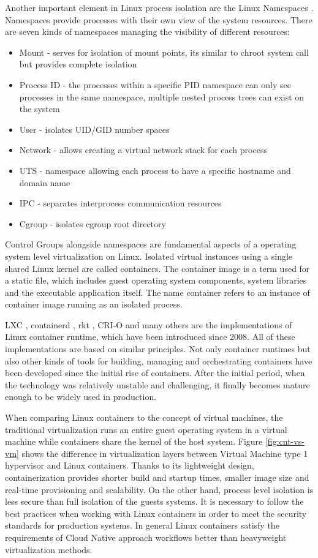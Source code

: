 \documentclass[
  digital, %
  twoside, %
  table,   %
  lof,     %
  lot,     %
]{fithesis3}
\begin{document}
Another important element in Linux process isolation are the Linux Namespaces \cite{linux_namespaces}. Namespaces provide processes with their own view of the system resources. There are seven kinds of namespaces managing the visibility of different resources:
\begin{itemize}
  \item Mount - serves for isolation of mount points, its similar to chroot system call but provides complete isolation
  \item Process ID - the processes within a specific PID namespace can only see processes in the same namespace, multiple nested process trees can exist on the system
  \item User - isolates UID/GID number spaces
  \item Network - allows creating a virtual network stack for each process
  \item UTS - namespace allowing each process to have a specific hostname and domain name
  \item IPC - separates interprocess communication resources
  \item Cgroup - isolates cgroup root directory
\end{itemize}


Control Groups alongside namespaces are fundamental aspects of a operating system level virtualization on Linux. Isolated virtual instances using a single shared Linux kernel are called containers. The container image is a term used for a static file, which includes guest operating system components, system libraries and the executable application itself. The name container refers to an instance of container image running as an isolated process.

LXC \cite{lxc}, containerd \cite{containerd}, rkt \cite{rkt}, CRI-O \cite{cri-o} and many others are the implementations of Linux container runtime, which have been introduced since 2008. All of these implementations are based on similar principles. Not only container runtimes but also other kinds of tools for building, managing and orchestrating containers have been developed since the initial rise of containers. After the initial period, when the technology was relatively unstable and challenging, it finally becomes mature enough to be widely used in production.

When comparing Linux containers to the concept of virtual machines, the traditional virtualization runs an entire guest operating system in a virtual machine while containers share the kernel of the host system. Figure \ref{fig:cnt-vs-vm} shows the difference in virtualization layers between Virtual Machine type 1 hypervisor \cite{hypervisors} and Linux containers. Thanks to its lightweight design, containerization provides shorter build and startup times, smaller image size and real-time provisioning and scalability. On the other hand, process level isolation is less secure than full isolation of the guests systems. It is necessary to follow the best practices when working with Linux containers in order to meet the security standards for production systems. In general Linux containers satisfy the requirements of Cloud Native approach workflows better than heavyweight virtualization methods.
\end{document}
